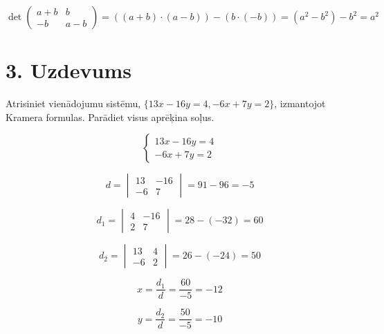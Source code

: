 \documentclass{article}
\begin{document}
\begin{equation*}
    \det
    \begin{pmatrix}
        a + b & b\\
        -b & a - b
    \end{pmatrix} 
    = 
    ((a + b) \cdot (a - b)) - (b \cdot (-b))
    = 
    (a^2 - b^2) - b^2
    =
    a^2
\end{equation*}

\clearpage

\section*{3. Uzdevums}
Atrisiniet vienādojumu sistēmu, $\{13x-16y=4, -6x+7y=2\}$, izmantojot Kramera formulas. Parādiet visus aprēķina soļus.

\begin{equation*}
    \begin{cases}
        13x -16y = 4\\
        -6x + 7y = 2
    \end{cases}
\end{equation*}

\begin{equation*}
    d 
    = 
    \begin{vmatrix}
        13 & -16\\
        -6 & 7
    \end{vmatrix}
    =
    91 - 96
    =
    -5
\end{equation*}

\begin{equation*}
    d_1
    = 
    \begin{vmatrix}
        4 & -16\\
        2 & 7
    \end{vmatrix}
    =
    28 - (-32)
    =
    60
\end{equation*}

\begin{equation*}
    d_2
    = 
    \begin{vmatrix}
        13 & 4\\
        -6 & 2
    \end{vmatrix}
    =
    26 - (-24)
    =
    50
\end{equation*}

\begin{equation*}
    x
    =
    \frac{d_1}{d}
    =
    \frac{60}{-5}
    =
    -12
\end{equation*}

\begin{equation*}
    y
    =
    \frac{d_2}{d}
    =
    \frac{50}{-5}
    =
    -10
\end{equation*}
\end{document}
